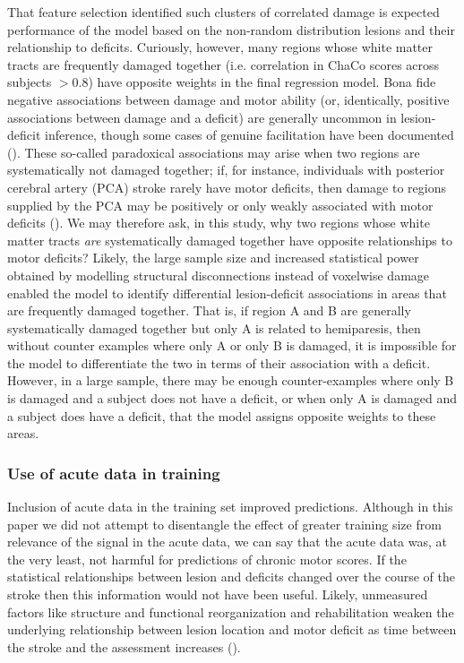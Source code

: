 \documentclass[10pt]{article}
\begin{document}
That feature selection identified such clusters of correlated damage is expected performance of the model based on the non-random distribution lesions and their relationship to deficits. Curiously, however, many regions whose white matter tracts are frequently damaged together (i.e. correlation in ChaCo scores across subjects $>$0.8) have opposite weights in the final regression model. Bona fide negative associations between damage and motor ability (or, identically, positive associations between damage and a deficit) are generally uncommon in lesion-deficit inference, though some cases of genuine facilitation have been documented (\cite{Kapur1996-xq, Sperber2020-kp}). These so-called paradoxical associations may arise when two regions are systematically not damaged together; if, for instance, individuals with posterior cerebral artery (PCA) stroke rarely have motor deficits, then damage to regions supplied by the PCA may be positively or only weakly associated with motor deficits (\cite{Sperber2020-kp}). We may therefore ask, in this study, why two regions whose white matter tracts \textit{are} systematically damaged together have opposite relationships to motor deficits? Likely, the large sample size and increased statistical power obtained by modelling structural disconnections instead of voxelwise damage enabled the model to identify differential lesion-deficit associations in areas that are frequently damaged together. That is, if region A and B are generally systematically damaged together but only A is related to hemiparesis, then without counter examples where only A or only B is damaged, it is impossible for the model to differentiate the two in terms of their association with a deficit. However, in a large sample, there may be enough counter-examples where only B is damaged and a subject does not have a deficit, or when only A is damaged and a subject does have a deficit, that the model assigns opposite weights to these areas. 


\subsubsection*{Use of acute data in training}
Inclusion of acute data in the training set improved predictions. Although in this paper we did not attempt to disentangle the effect of greater training size from relevance of the signal in the acute data, we can say that the acute data was, at the very least, not harmful for predictions of chronic motor scores. If the statistical relationships between lesion and deficits changed over the course of the stroke then this information would not have been useful. Likely, unmeasured factors like structure and functional reorganization and rehabilitation weaken the underlying relationship between lesion location and motor deficit as time between the stroke and the assessment increases (\cite{Shahid2017-gx}). 
\end{document}
